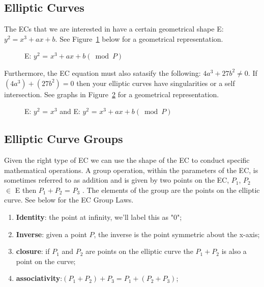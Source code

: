 \subsection{Elliptic Curves}
The  ECs that we are interested in have a certain geometrical shape E: $y^2 = x^3 + ax + b$.  See Figure~\ref{fig:DH:DHKE_5} below for a geometrical representation.  
\begin{figure}[H]
	  \caption{\label{fig:DH:DHKE_5}   E: $ y^2$ = $x^3+ax+b (\bmod P)$ }
\end{figure}
Furthermore, the EC equation must also satasify the following: $4a^3 + 27b^2 \neq 0$. If $(4a^3)+(27b^2) = 0$ then your elliptic curves have singularities or a self intersection.  See graphs in Figure~\ref{fig:DH:DHKE_10} for a geometrical representation.
\begin{figure}[H]
	  \caption{\label{fig:DH:DHKE_10} E: $ y^2$ = $x^3$ and E: $ y^2$ = $x^3+ax+b (\bmod P)$ }
\end{figure}

\subsection{Elliptic Curve Groups}
Given the right type of EC we can use the shape of the EC to conduct specific mathematical operations. A group operation, within the parameters of the EC, is sometimes referred to as addition and is given by two points on the EC, $P_1$, $P_2$ $\in$ E then $P_1 + P_2$ = $P_3$ .  The elements of the group are the points on the elliptic curve.  See below for the EC Group Laws.

\begin{enumerate}[1.]
\item \textbf{Identity}: the point at infinity, we'll label this as "0"; 
\item \textbf{Inverse}: given a point $P$, the inverse is the point symmetric about the x-axis;
\item \textbf{closure}: if $P_1$ and $P_2$ are points on the elliptic curve the $P_1 + P_2$ is also a point on the curve;
\item \textbf{associativity}:$(P_1 + P_2) + P_3 = P_1 + (P_2 + P_3)$;
\end{enumerate}



